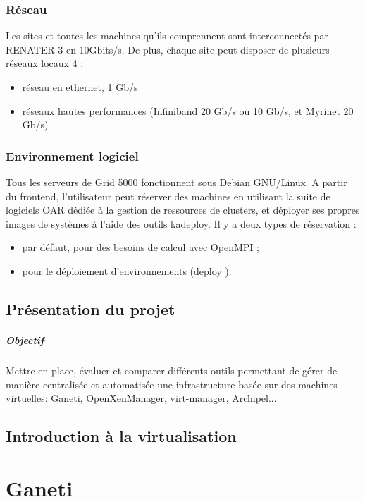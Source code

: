 \documentclass[a4paper,11pt]{report}
\begin{document}
  \subsection{Réseau}
Les sites et toutes les machines qu'ils comprennent sont interconnectés par RENATER 3 en 10Gbits/s. De
plus, chaque site peut disposer de plusieurs réseaux locaux 4 :
\begin{itemize}
\item réseau en ethernet, 1 Gb/s
\item réseaux hautes performances (Infiniband 20 Gb/s ou 10 Gb/s, et Myrinet 20 Gb/s)
\end{itemize}

  \subsection{Environnement logiciel}
Tous les serveurs de Grid 5000 fonctionnent sous Debian GNU/Linux.
A partir du frontend, l'utilisateur peut réserver des machines en utilisant la suite de logiciels OAR dédiée à
la gestion de ressources de clusters, et déployer ses propres images de systèmes à l'aide des outils kadeploy.
Il y a deux types de réservation :
\begin{itemize}
\item par défaut, pour des besoins de calcul avec OpenMPI ;
\item pour le déploiement d'environnements (deploy ).
\end{itemize}

     \newpage
     \section{Présentation du projet}
     \paragraph{Objectif}
Mettre en place, évaluer et comparer différents outils permettant de gérer de manière
centralisée et automatisée une infrastructure basée sur des machines virtuelles: Ganeti,
OpenXenManager, virt-manager, Archipel...
      \section{Introduction à la virtualisation}

    \chapter{Ganeti}
\end{document}
